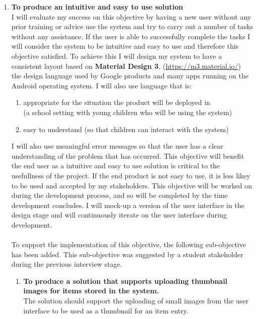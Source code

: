 \documentclass[../../../main.tex]{subfiles}
\begin{document}
\begin{enumerate}
      \item \textbf{To produce an intuitive and easy to use solution}\\
            I will evaluate my success on this objective by having a new user without any prior training or advice use the system and
            try to carry out a number of tasks without any assistance. If the user is able to successfully complete the tasks
            I will consider the system to be intuitive and easy to use and therefore this objective satisfied.
            To achieve this I will design my system to have a consistent layout based on \textbf{Material Design 3}, (\url{https://m3.material.io/})
            the design language used by Google products and many apps running on the Android operating system.
            I will also use language that is:
            \begin{enumerate}
                  \item appropriate for the situation the product will be deployed in\\(a school setting with young children who will be using the system)
                  \item easy to understand (so that children can interact with the system)
            \end{enumerate}
            I will also use meaningful error messages so that the user has a clear understanding of the problem that has occurred.
            This objective will benefit the end user as a intuitive and easy to use solution is critical to the usefullness of the project. If the end product is not easy to use, it is less likey to be used and accepted by my stakeholders.
            This objective will be worked on during the development process, and so will be completed by the time development concludes. I will mock-up a version of the user interface in the design stage and will continuously iterate on the user interface during development.\\\\
            To support the implementation of this objective, the following sub-objective has been added. This sub-objective was suggested by a student stakeholder during the previous interview stage.
            \begin{enumerate}
                  \item \textbf{To produce a solution that supports uploading thumbnail images for items stored in the system.}\\
                        The solution should support the uploading of small images from the user interface to be used as a thumbnail for an item entry.

\end{enumerate}
\end{enumerate}
\end{document}
